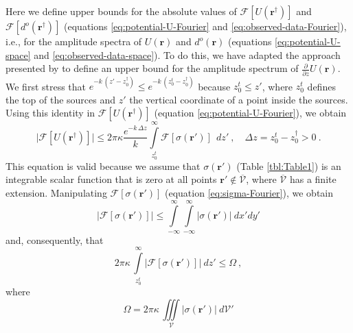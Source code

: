 \label{app:upper-bounds}

Here we define upper bounds for the absolute values
of $\mathcal{F} [ U(\mathbf{r}^{\dagger}) ]$ and $\mathcal{F} [ d^{o}(\mathbf{r}^{\dagger}) ]$ 
(equations \ref{eq:potential-U-Fourier} and \ref{eq:observed-data-Fourier}), 
i.e., for the amplitude spectra of $U(\mathbf{r})$ and $d^{o}(\mathbf{r})$ 
(equations \ref{eq:potential-U-space} and \ref{eq:observed-data-space}). 
To do this, we have adapted the approach presented by
\citet{bhattacharyya1967} to define an upper bound for the amplitude spectrum of 
$\tfrac{\partial}{\partial z} U(\mathbf{r})$. 
We first stress that 
$e^{- k \, (z' - z^{\dagger}_{0})} \le e^{- k \, (z^{t}_{0} - z^{\dagger}_{0})}$ because
$z^{t}_{0} \le z'$, where $z^{t}_{0}$ defines the top of the sources and $z'$ the vertical
coordinate of a point inside the sources. Using this identity in  
$\mathcal{F} [ U(\mathbf{r}^{\dagger}) ]$ (equation \ref{eq:potential-U-Fourier}), we obtain
\begin{equation}
	\vert \mathcal{F} [ U(\mathbf{r}^{\dagger}) ] \vert \le 2 \pi \kappa 
	\frac{e^{- k \, \Delta z}}{k}
	\int\limits_{z^{t}_{0}}^{\infty}
	\mathcal{F} [ \sigma(\mathbf{r}') ] \:
	\: dz' \: , \quad \Delta z = z^{t}_{0} - z^{\dagger}_{0} > 0 \: .
	\label{eq:potential-U-spectrum-bound1}
\end{equation}
This equation is valid because we assume that $\sigma(\mathbf{r}')$ (Table \ref{tbl:Table1}) 
is an integrable scalar function that is zero at all points $\mathbf{r}' \notin \overline{\mathcal{V}}$, 
where $\overline{\mathcal{V}}$ has a finite extension. 
Manipulating $\mathcal{F} [ \sigma(\mathbf{r}') ]$ (equation \ref{eq:sigma-Fourier}), 
we obtain
\begin{equation}
	\vert \mathcal{F} [ \sigma(\mathbf{r}') ] \vert \le
	\int\limits_{-\infty}^{\infty}\int\limits_{-\infty}^{\infty}
	\vert \sigma(\mathbf{r}') \vert 
	\: dx'dy'
	\label{eq:sigma-spectrum-bound}
\end{equation}
and, consequently, that
\begin{equation}
	2 \pi \kappa \, 
	\int\limits_{z^{t}_{0}}^{\infty}
	\vert \mathcal{F} [ \sigma(\mathbf{r}') ] \vert
	\: dz' \le \Omega \: ,
	\label{eq:Omega-bound}
\end{equation}
where
\begin{equation}
	\Omega = 2 \pi \kappa \, \iiint\limits_{\mathcal{V}}
	\vert \sigma(\mathbf{r}') \vert 
	\: d\mathcal{V}'
	\label{eq:Omega}
\end{equation}
